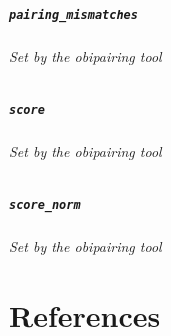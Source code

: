 \documentclass[
  letterpaper,
  DIV=11,
  numbers=noendperiod]{scrreprt}
\let\oldparagraph\paragraph
\renewcommand{\paragraph}[1]{\oldparagraph{#1}\mbox{}}
\let\oldsubparagraph\subparagraph
\renewcommand{\subparagraph}[1]{\oldsubparagraph{#1}\mbox{}}
\begin{document}
\hypertarget{pairing_mismatches}{%
\paragraph{\texorpdfstring{\texttt{pairing\_mismatches}}{pairing\_mismatches}}\label{pairing_mismatches}}

\hypertarget{set-by-the-obipairing-tool-3}{%
\subparagraph{\texorpdfstring{Set by the \emph{obipairing}
tool}{Set by the obipairing tool}}\label{set-by-the-obipairing-tool-3}}

\hypertarget{score}{%
\paragraph{\texorpdfstring{\texttt{score}}{score}}\label{score}}

\hypertarget{set-by-the-obipairing-tool-4}{%
\subparagraph{\texorpdfstring{Set by the \emph{obipairing}
tool}{Set by the obipairing tool}}\label{set-by-the-obipairing-tool-4}}

\hypertarget{score_norm}{%
\paragraph{\texorpdfstring{\texttt{score\_norm}}{score\_norm}}\label{score_norm}}

\hypertarget{set-by-the-obipairing-tool-5}{%
\subparagraph{\texorpdfstring{Set by the \emph{obipairing}
tool}{Set by the obipairing tool}}\label{set-by-the-obipairing-tool-5}}

\hypertarget{references}{%
\chapter*{References}\label{references}}

\end{document}

